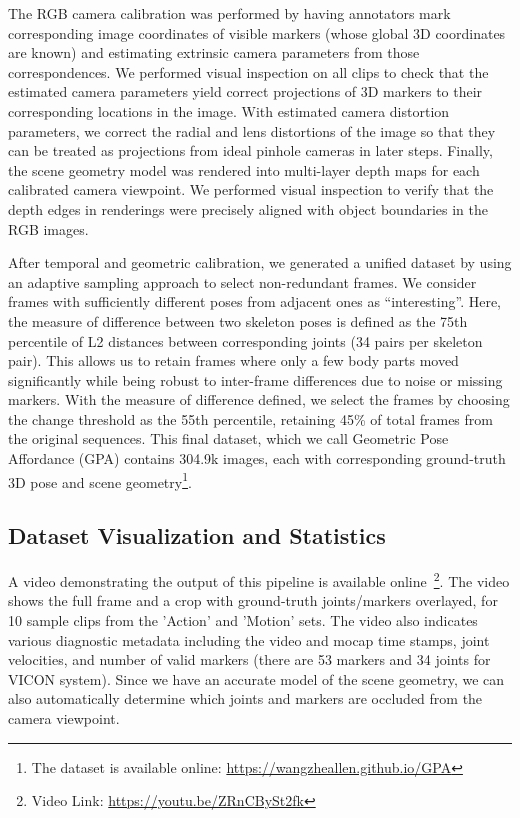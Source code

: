 \documentclass[times,referee,twocolumn,final,authoryear]{elsarticle}
\begin{document}
The RGB camera calibration was performed by having annotators mark 
corresponding image coordinates of visible markers (whose global 3D coordinates 
are known) and estimating extrinsic camera parameters from those correspondences. We performed 
visual inspection on all clips to check that the estimated camera parameters yield 
correct projections of 3D markers to their corresponding locations in the image.
With estimated camera distortion parameters, we correct the radial and lens distortions 
of the image so that they can be treated as projections from ideal pinhole cameras 
in later steps. Finally, the scene geometry model was rendered into multi-layer 
depth maps for each calibrated camera viewpoint. We performed visual inspection to 
verify that the depth edges in renderings were precisely aligned with object boundaries 
in the RGB images.

After temporal and geometric calibration, we generated a unified dataset by using
an adaptive sampling approach to select non-redundant frames. We consider frames 
with sufficiently different poses from adjacent ones as ``interesting''.  Here, the
measure of difference between two skeleton poses is defined as the 75th percentile
of L2 distances between corresponding joints (34 pairs per skeleton pair).
This allows us to retain frames where only a few body parts moved significantly
while being robust to inter-frame differences due to noise or missing markers.
With the measure of difference defined, we select the frames by choosing the 
change threshold as the 55th percentile, retaining 45\% of total frames from
the original sequences. This final dataset, which we call Geometric Pose Affordance 
(GPA) contains 304.9k images, each with corresponding ground-truth 3D pose and 
scene geometry\footnote{The dataset is available online: {\url{https://wangzheallen.github.io/GPA}}}. 

\subsection{Dataset Visualization and Statistics}

A video demonstrating the output of this pipeline is available online~\footnote 
{ Video Link: {\url{https://youtu.be/ZRnCBySt2fk}}}. The video shows the full 
frame and a crop with ground-truth joints/markers overlayed, for 10 sample clips 
from the 'Action' and 'Motion' sets.  The video also indicates various diagnostic 
metadata including the video and mocap time stamps, joint velocities, and number of 
valid markers (there are 53 markers and 34 joints for VICON system). Since we have 
an accurate model of the scene geometry, we can also automatically determine which 
joints and markers are occluded from the camera viewpoint.
\end{document}
